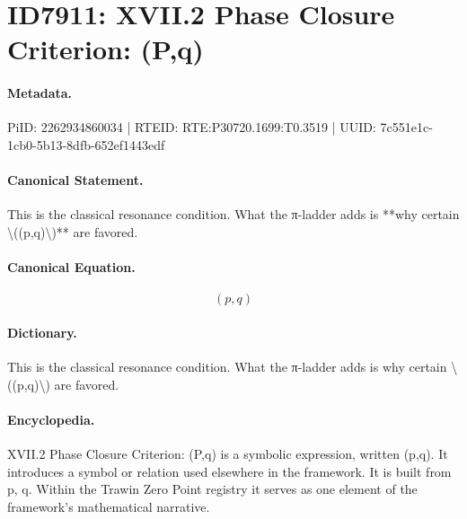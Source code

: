 \section*{ID7911: XVII.2 Phase Closure Criterion: (P,q)}
\paragraph{Metadata.}
PiID: 2262934860034 | RTEID: RTE:P30720.1699:T0.3519 | UUID: 7c551e1c-1cb0-5b13-8dfb-652ef1443edf

\paragraph{Canonical Statement.}
This is the classical resonance condition. What the π-ladder adds is **why certain \textbackslash{}((p,q)\textbackslash{})** are favored.

\paragraph{Canonical Equation.}
\[
(p,q)
\]

\paragraph{Dictionary.}
This is the classical resonance condition. What the π-ladder adds is why certain \textbackslash{}((p,q)\textbackslash{}) are favored.

\paragraph{Encyclopedia.}
XVII.2 Phase Closure Criterion: (P,q) is a symbolic expression, written (p,q). It introduces a symbol or relation used elsewhere in the framework. It is built from p, q. Within the Trawin Zero Point registry it serves as one element of the framework's mathematical narrative.
